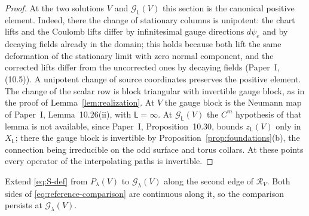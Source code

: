 \documentclass[11pt]{amsart}
\theoremstyle{definition}
\theoremstyle{remark}
\theoremstyle{plain}
\numberwithin{equation}{section}
\begin{document}
\begin{proof}
At the two solutions $V$ and $\mathcal G_{\mathsf L}(V)$ this section is
the canonical positive element. Indeed, there the change of stationary
columns is unipotent: the chart lifts and the Coulomb lifts differ by
infinitesimal gauge directions $d\psi_e$ and by decaying fields already
in the domain; this holds because both lift the same deformation of the stationary
limit with zero normal component, and the corrected lifts differ from the
uncorrected ones by decaying fields (Paper~I, (10.5)). A unipotent change of
source coordinates preserves the positive element.
The change of the scalar row is block triangular with invertible gauge
block, as in the proof of Lemma~\ref{lem:realization}. At $V$ the gauge
block is the Neumann map of Paper~I, Lemma~10.26(ii), with
$\mathsf L=\infty$. At $\mathcal G_{\mathsf L}(V)$ the $C^m$ hypothesis of
that lemma is not available, since Paper~I, Proposition~10.30, bounds
$z_{\mathsf L}(V)$ only in $X_{\mathsf L}$; there the gauge block is
invertible by Proposition~\ref{prop:foundations}(b), the connection being
irreducible on the odd surface and torus collars. At these points every
operator of the interpolating paths
is invertible.
\end{proof}

Extend \eqref{eq:S-def} from $P_\lambda(V)$ to $\mathcal G_\lambda(V)$ along
the second edge of $\mathcal R_V$. Both sides of
\eqref{eq:reference-comparison} are continuous along it, so the
comparison persists at $\mathcal G_\lambda(V)$.
\end{document}
